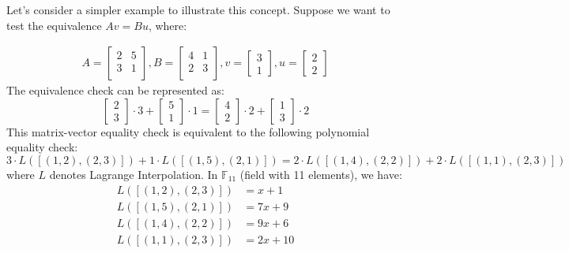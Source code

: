 \documentclass{article}
\begin{document}
Let's consider a simpler example to illustrate this concept. Suppose we want to test the equivalence $Av = Bu$, where:

\begin{align*}
A = \begin{bmatrix}
2 & 5 \\
3 & 1 \\
\end{bmatrix},
B = \begin{bmatrix}
4 & 1 \\
2 & 3 \\
\end{bmatrix},
v = \begin{bmatrix}
3 \\ 1
\end{bmatrix},
u = \begin{bmatrix}
2 \\ 2
\end{bmatrix}
\end{align*}
The equivalence check can be represented as:
\begin{equation*}
\begin{bmatrix}
2 \\ 3
\end{bmatrix} \cdot 3 + \begin{bmatrix}
5 \\ 1
\end{bmatrix} \cdot 1 = \begin{bmatrix}
4 \\ 2
\end{bmatrix} \cdot 2 + \begin{bmatrix}
1 \\ 3
\end{bmatrix} \cdot 2
\end{equation*}
This matrix-vector equality check is equivalent to the following polynomial equality check:
\begin{equation*}
3 \cdot L([(1, 2), (2, 3)]) + 1 \cdot L([(1, 5), (2, 1)]) = 2 \cdot L([(1, 4), (2, 2)]) + 2 \cdot L([(1, 1), (2, 3)])
\end{equation*}
where $L$ denotes Lagrange Interpolation. In $\mathbb{F}_{11}$ (field with 11 elements), we have:
\begin{align*}
L([(1, 2), (2, 3)]) &= x + 1 \\
L([(1, 5), (2, 1)]) &= 7x + 9 \\
L([(1, 4), (2, 2)]) &= 9x + 6 \\
L([(1, 1), (2, 3)]) &= 2x + 10
\end{align*}
\end{document}
